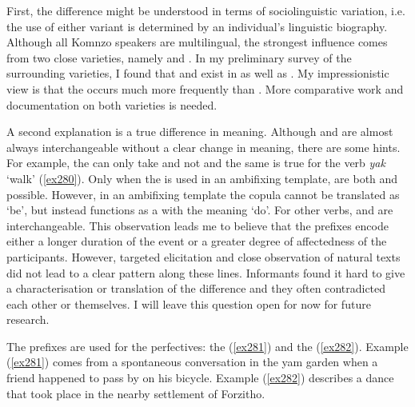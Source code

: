 First, the difference might be understood in terms of sociolinguistic variation, i.e. the use of either variant is determined by an individual's linguistic biography. Although all Komnzo speakers are multilingual, the strongest influence comes from two close varieties, namely  and . In my preliminary survey of the surrounding varieties, I found that \Betaone{} and \Betatwo{} exist in  as well as . My impressionistic view is that the \Betatwo{}  occurs much more frequently than \Betaone. More comparative work and documentation on both varieties is needed.%

A second explanation is a true difference in meaning. Although \Betaone{} and \Betatwo{} are almost always interchangeable without a clear change in meaning, there are some hints. For example, the  can only take \Betatwo{} and not \Betaone{} and the same is true for the verb \emph{yak} `walk' (\ref{ex280}). Only when the  is used in an ambifixing template, are both \Betaone{} and \Betatwo{} possible. However, in an ambifixing template the copula cannot be translated as `be', but instead functions as a  with the meaning `do'. For other verbs, \Betaone{} and \Betatwo{} are interchangeable. This observation leads me to believe that the \Betatwo{} prefixes encode either a longer duration of the event or a greater degree of affectedness of the participants. However, targeted elicitation and close observation of natural texts did not lead to a clear pattern along these lines. Informants found it hard to give a characterisation or translation of the difference and they often contradicted each other or themselves. I will leave this question open for now for future research.%

The \Gam{} prefixes are used for the perfectives: the   (\ref{ex281}) and the   (\ref{ex282}). Example (\ref{ex281}) comes from a spontaneous conversation in the yam garden when a friend happened to pass by on his bicycle. Example (\ref{ex282}) describes a dance that took place in the nearby settlement of Forzitho.

